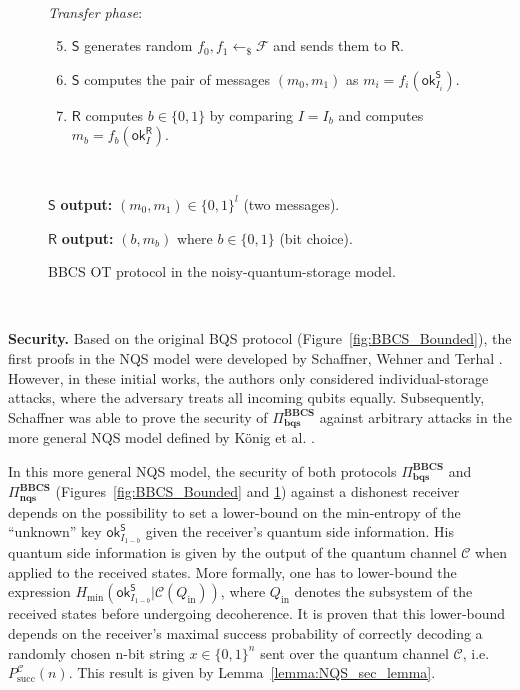 \begin{figure}[h!]
\begin{tcolorbox}
    \
    
    \textit{Transfer phase}:
            \begin{enumerate}
            \setcounter{enumi}{4}
                \item $\mathsf{S}$ generates random $f_0, f_1 \leftarrow_{\$}\mathcal{F}$ and sends them to $\mathsf{R}$.
                \item $\mathsf{S}$ computes the pair of messages $(m_0, m_1)$ as $m_i = f_i(\mathsf{ok}^{\mathsf{S}}_{I_{i}})$.
                \item $\mathsf{R}$ computes $b\in\{0, 1\}$ by comparing $I = I_b$ and computes $m_b = f_b(\mathsf{ok}^{\mathsf{R}}_{I})$. 
            \end{enumerate}
    
    
   
    
    \
    
$\mathsf{S}$ \textbf{output:} $(m_0, m_1)\in\{0,1\}^l$ (two messages).

$\mathsf{R}$ \textbf{output:} $(b, m_b)$ where $b\in\{0,1\}$ (bit choice).
    
\end{tcolorbox}
    \caption{BBCS OT protocol in the noisy-quantum-storage model.}
    \label{fig:BBCS_Noisy}
\end{figure}


\

\noindent\textbf{Security.} Based on the original BQS protocol (Figure~\ref{fig:BBCS_Bounded}), the first proofs in the NQS model were developed by Schaffner, Wehner and Terhal \cite{WST08, STW09}. However, in these initial works, the authors only considered individual-storage attacks, where the adversary treats all incoming qubits equally. Subsequently, Schaffner \cite{S10} was able to prove the security of $\Pi^{\textbf{BBCS}}_{\textbf{bqs}}$ against arbitrary attacks in the more general NQS model defined by K\"onig et al. \cite{KWW12}. 

In this more general NQS model, the security of both protocols $\Pi^{\textbf{BBCS}}_{\textbf{bqs}}$ and $\Pi^{\textbf{BBCS}}_{\textbf{nqs}}$ (Figures~\ref{fig:BBCS_Bounded} and \ref{fig:BBCS_Noisy}) against a dishonest receiver depends on the possibility to set a lower-bound on the min-entropy of the ``unknown'' key $\mathsf{ok}^{\mathsf{S}}_{I_{1-b}}$ given the receiver's quantum side information. His quantum side information is given by the output of the quantum channel $\mathcal{C}$ when applied to the received states. More formally, one has to lower-bound the expression $H_{\text{min}}\left(\mathsf{ok}^{\mathsf{S}}_{I_{1-b}} | \mathcal{C}\left(Q_{\text{in}}\right)\right)$, where $Q_{\text{in}}$ denotes the subsystem of the received states before undergoing decoherence. It is proven \cite{KWW12} that this lower-bound depends on the receiver's maximal success probability of correctly decoding a randomly chosen n-bit string $x \in \{0,1\}^n$ sent over the quantum
channel $\mathcal{C}$, i.e. $P^{\mathcal{C}}_{\text{succ}}(n)$. This result is given by Lemma~\ref{lemma:NQS_sec_lemma}.

